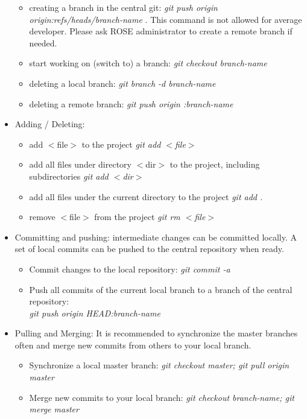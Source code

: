 \begin{itemize}
\begin{itemize}
          \item creating a branch in the central git: \textit{git push origin origin:refs/heads/branch-name} . This command is not allowed for average developer. Please ask ROSE administrator to create a remote branch if needed.
          \item start working on (switch to) a branch: \textit{git checkout branch-name} 
          \item deleting a local branch: \textit{git branch -d branch-name} 
          \item deleting a remote branch: \textit{git push origin :branch-name } 
   \end{itemize}     
\item Adding / Deleting:
   \begin{itemize}
          \item add $<$file$>$ to the project \textit{git add $<$file$>$}
          \item add all files under directory $<$dir$>$ to the project, including subdirectories \textit{git add $<$dir$>$}
	  \item add all files under the current directory to the project \textit{git add .}
	  \item remove $<$file$>$ from the project \textit{git rm $<$file$>$}
   \end{itemize}     
\item Committing and pushing: intermediate changes can be committed locally. A set of local commits can be pushed to the central repository when ready.
   \begin{itemize}
          \item Commit changes to the local repository: \textit{git commit -a} 
          \item Push all commits of the current local branch to a branch of the central repository:\\ \textit{git push origin HEAD:branch-name}
   \end{itemize}   
\item Pulling and Merging: It is recommended to synchronize the master branches often and merge new commits from others to 
   your local branch.
   \begin{itemize}
          \item Synchronize a local master branch: \textit{git checkout master; git pull origin master}
          \item Merge new commits to your local branch: \textit{git checkout branch-name; git merge master}
   \end{itemize}   


\end{itemize}
